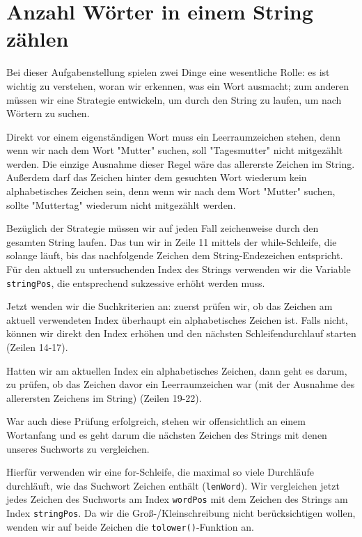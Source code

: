 \chapter{Anzahl Wörter in einem String zählen}

Bei dieser Aufgabenstellung spielen zwei Dinge eine wesentliche Rolle: es ist
wichtig zu verstehen, woran wir erkennen, was ein Wort ausmacht; zum anderen
müssen wir eine Strategie entwickeln, um durch den String zu laufen, um nach
Wörtern zu suchen.

Direkt vor einem eigenständigen Wort muss ein Leerraumzeichen stehen, denn wenn
wir nach dem Wort "Mutter" suchen, soll "Tagesmutter" nicht mitgezählt werden.
Die einzige Ausnahme dieser Regel wäre das allererste Zeichen im String.
Außerdem darf das Zeichen hinter dem gesuchten Wort wiederum kein alphabetisches
Zeichen sein, denn wenn wir nach dem Wort "Mutter" suchen, sollte "Muttertag"
wiederum nicht mitgezählt werden.

Bezüglich der Strategie müssen wir auf jeden Fall zeichenweise durch den
gesamten String laufen. Das tun wir in Zeile 11 mittels der while-Schleife, die
solange läuft, bis das nachfolgende Zeichen dem String-Endezeichen entspricht.
Für den aktuell zu untersuchenden Index des Strings verwenden wir die Variable
\texttt{stringPos}, die entsprechend sukzessive erhöht werden muss.

Jetzt wenden wir die Suchkriterien an: zuerst prüfen wir, ob das Zeichen am
aktuell verwendeten Index überhaupt ein alphabetisches Zeichen ist. Falls nicht,
können wir direkt den Index erhöhen und den nächsten Schleifendurchlauf starten
(Zeilen 14-17).

Hatten wir am aktuellen Index ein alphabetisches Zeichen, dann geht es darum, zu
prüfen, ob das Zeichen davor ein Leerraumzeichen war (mit der Ausnahme des
allerersten Zeichens im String) (Zeilen 19-22).

War auch diese Prüfung erfolgreich, stehen wir offensichtlich an einem Wortanfang
und es geht darum die nächsten Zeichen des Strings mit denen unseres Suchworts
zu vergleichen.

Hierfür verwenden wir eine for-Schleife, die maximal so viele Durchläufe
durchläuft, wie das Suchwort Zeichen enthält (\texttt{lenWord}). Wir
vergleichen jetzt jedes Zeichen des Suchworts am Index \texttt{wordPos}
mit dem Zeichen des Strings am Index \texttt{stringPos}. Da wir die
Groß-/Kleinschreibung nicht berücksichtigen wollen, wenden wir auf beide Zeichen
die \texttt{tolower()}-Funktion an.


